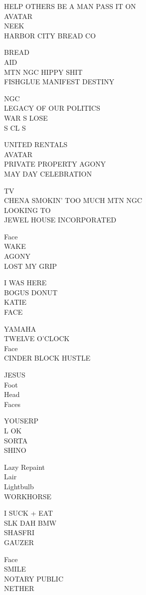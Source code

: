 \documentclass[10pt,letterpaper]{article}
\begin{document}
HELP OTHERS BE A MAN PASS IT ON\\
AVATAR\\
NEEK\\
HARBOR CITY BREAD CO

BREAD\\
AID\\
MTN NGC HIPPY SHIT\\
FISHGLUE MANIFEST DESTINY

NGC\\
LEGACY OF OUR POLITICS\\
WAR S LOSE\\
S CL S

UNITED RENTALS\\
AVATAR\\
PRIVATE PROPERTY AGONY\\
MAY DAY CELEBRATION

TV\\
CHENA SMOKIN' TOO MUCH MTN NGC\\
LOOKING TO\\
JEWEL HOUSE INCORPORATED

Face\\
WAKE\\
AGONY\\
LOST MY GRIP

I WAS HERE\\
BOGUS DONUT\\
KATIE\\
FACE

YAMAHA\\
TWELVE O'CLOCK\\
Face\\
CINDER BLOCK HUSTLE

JESUS\\
Foot\\
Head\\
Faces

YOUSERP\\
L OK\\
SORTA\\
SHINO

Lazy Repaint\\
Lair\\
Lightbulb\\
WORKHORSE

I SUCK + EAT\\
SLK DAH BMW\\
SHASFRI\\
GAUZER

Face\\
SMILE\\
NOTARY PUBLIC\\
NETHER
\end{document}
